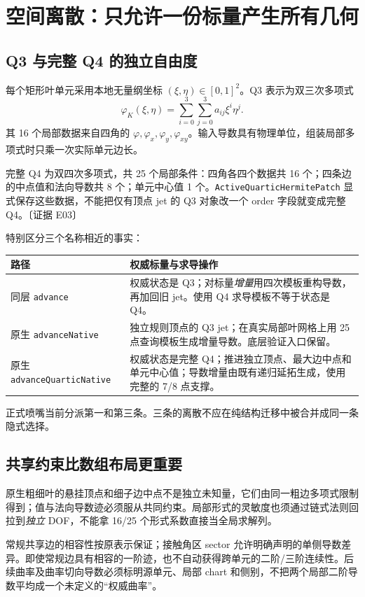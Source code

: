 \documentclass[UTF8,a4paper,11pt,fontset=fandol]{ctexart}
\newcommand{\code}[1]{\nolinkurl{#1}}
\newcommand{\ev}[1]{{\small\color{muted}〔证据 #1〕}}
\newcommand{\ph}{\varphi}\newcommand{\dt}{\Delta t}
\begin{document}
\section{空间离散：只允许一份标量产生所有几何}
\subsection{Q3 与完整 Q4 的独立自由度}
每个矩形叶单元采用本地无量纲坐标 $(\xi,\eta)\in[0,1]^2$。Q3 表示为双三次多项式
\[
 \ph_K(\xi,\eta)=\sum_{i=0}^{3}\sum_{j=0}^{3}a_{ij}\xi^i\eta^j.
\]
其 16 个局部数据来自四角的 $\ph,\ph_x,\ph_y,\ph_{xy}$。输入导数具有物理单位，组装局部多项式时只乘一次实际单元边长。

完整 Q4 为双四次多项式，共 25 个局部条件：四角各四个数据共 16 个；四条边的中点值和法向导数共 8 个；单元中心值 1 个。\code{ActiveQuarticHermitePatch} 显式保存这些数据，不能把仅有顶点 jet 的 Q3 对象改一个 order 字段就变成完整 Q4。\ev{E03}

特别区分三个名称相近的事实：
\begin{longtable}{@{}P{.31\textwidth}P{.63\textwidth}@{}}
\toprule 路径 & 权威标量与求导操作\\\midrule\endhead
同层 \code{advance} & 权威状态是 Q3；对标量\emph{增量}用四次模板重构导数，再加回旧 jet。使用 Q4 求导模板不等于状态是 Q4。\\
原生 \code{advanceNative} & 独立规则顶点的 Q3 jet；在真实局部叶网格上用 25 点查询模板生成增量导数。底层验证入口保留。\\
原生 \code{advanceQuarticNative} & 权威状态是完整 Q4；推进独立顶点、最大边中点和单元中心值；导数增量由既有递归延拓生成，使用完整的 7/8 点支撑。\\
\bottomrule
\end{longtable}
正式喷嘴当前分派第一和第三条。三条的离散不应在纯结构迁移中被合并成同一条隐式选择。

\subsection{共享约束比数组布局更重要}
原生粗细叶的悬挂顶点和细子边中点不是独立未知量，它们由同一粗边多项式限制得到；值与法向导数迹必须服从共同约束。局部形式的灵敏度也须通过链式法则回拉到\emph{独立} DOF，不能拿 16/25 个形式系数直接当全局求解列。

常规共享边的相容性按原表示保证；接触角区 sector 允许明确声明的单侧导数差异。即使常规边具有相容的一阶迹，也不自动获得跨单元的二阶/三阶连续性。后续曲率及曲率切向导数必须标明源单元、局部 chart 和侧别，不把两个局部二阶导数平均成一个未定义的“权威曲率”。
\end{document}
